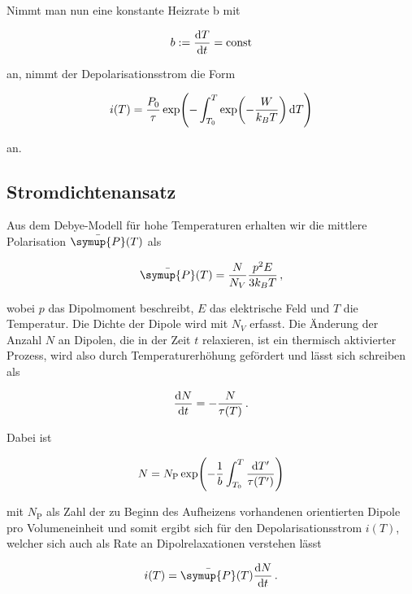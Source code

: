 Nimmt man nun eine konstante Heizrate b mit

\begin{equation}
    b := \frac{\mathinner{\mathrm{d} T}}{\mathinner{\mathrm{d} t}} = \text{const}
    \label{eqn:heiz}
\end{equation}

an, nimmt der Depolarisationsstrom die Form

\begin{equation}
    i(T) = \frac{P_0}{\tau} \exp\!\left(-\int_{T_0}^T
      \exp\!\left(- \frac{W}{k_B T}\right) \mathinner{\mathrm{d} T}\right)
\end{equation}

an.

\subsection{Stromdichtenansatz}

Aus dem Debye-Modell für hohe Temperaturen erhalten wir die mittlere Polarisation\cite{polarisation} $\bar{\symup{P}}(T)$ als

\begin{equation}
    \bar{\symup{P}}(T) = \frac{N}{N_V}\frac{p^2 E}{3k_B T}\,,
\end{equation}

wobei $p$ das Dipolmoment beschreibt, $E$ das elektrische Feld und $T$ die Temperatur.
Die Dichte der Dipole wird mit $N_V$ erfasst.
Die Änderung der Anzahl $N$ an Dipolen, die in der Zeit $t$ relaxieren, ist ein
thermisch aktivierter Prozess,
wird also durch Temperaturerhöhung gefördert und lässt sich schreiben als

\begin{equation}
    \frac{\mathinner{\mathrm{d} N}}{\mathinner{\mathrm{d} t}} = -\frac{N}{\tau(T)}\,.
    \label{eqn:dNdt}
\end{equation}

Dabei ist

\begin{equation*}
    N = N_\mathrm{P} \exp\!\left( -\frac{1}{b} \int_{T_0}^T
      \frac{\mathinner{\mathrm{d} T'}}{\tau(T')} \right)
    \label{eqn:anzahlDipole}
\end{equation*}

mit $N_\mathrm{P}$ als Zahl der zu Beginn des Aufheizens vorhandenen orientierten Dipole pro Volumeneinheit
und somit ergibt sich für den Depolarisationsstrom $i(T)$, welcher sich auch als Rate an Dipolrelaxationen verstehen lässt

\begin{equation}
    i(T) = \bar{\symup{P}}(T) \frac{\dif{N}}{\dif{t}}\,.
    \label{eqn:polstrom}
\end{equation}

